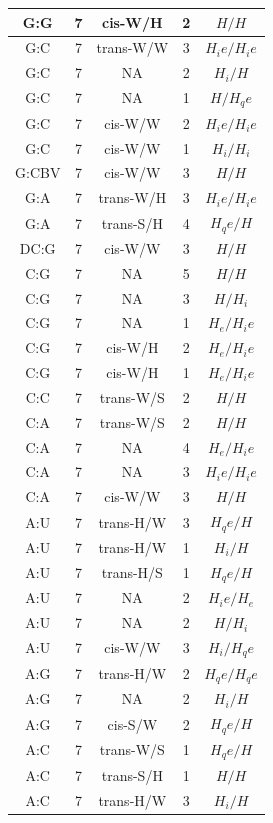 \begin{center}
\begin{longtable}{c|c|c|c|c}
G:G & 7 & cis-W/H & 2 & $H/H$ \\  \hline
G:C & 7 & trans-W/W & 3 & $H_ie/H_ie$ \\  \hline
G:C & 7 & NA & 2 & $H_i/H$ \\  \hline
G:C & 7 & NA & 1 & $H/H_qe$ \\  \hline
G:C & 7 & cis-W/W & 2 & $H_ie/H_ie$ \\  \hline
G:C & 7 & cis-W/W & 1 & $H_i/H_i$ \\  \hline
G:CBV & 7 & cis-W/W & 3 & $H/H$ \\  \hline
G:A & 7 & trans-W/H & 3 & $H_ie/H_ie$ \\  \hline
G:A & 7 & trans-S/H & 4 & $H_qe/H$ \\  \hline
DC:G & 7 & cis-W/W & 3 & $H/H$ \\  \hline
C:G & 7 & NA & 5 & $H/H$ \\  \hline
C:G & 7 & NA & 3 & $H/H_i$ \\  \hline
C:G & 7 & NA & 1 & $H_e/H_ie$ \\  \hline
C:G & 7 & cis-W/H & 2 & $H_e/H_ie$ \\  \hline
C:G & 7 & cis-W/H & 1 & $H_e/H_ie$ \\  \hline
C:C & 7 & trans-W/S & 2 & $H/H$ \\  \hline
C:A & 7 & trans-W/S & 2 & $H/H$ \\  \hline
C:A & 7 & NA & 4 & $H_e/H_ie$ \\  \hline
C:A & 7 & NA & 3 & $H_ie/H_ie$ \\  \hline
C:A & 7 & cis-W/W & 3 & $H/H$ \\  \hline
A:U & 7 & trans-H/W & 3 & $H_qe/H$ \\  \hline
A:U & 7 & trans-H/W & 1 & $H_i/H$ \\  \hline
A:U & 7 & trans-H/S & 1 & $H_qe/H$ \\  \hline
A:U & 7 & NA & 2 & $H_ie/H_e$ \\  \hline
A:U & 7 & NA & 2 & $H/H_i$ \\  \hline
A:U & 7 & cis-W/W & 3 & $H_i/H_qe$ \\  \hline
A:G & 7 & trans-H/W & 2 & $H_qe/H_qe$ \\  \hline
A:G & 7 & NA & 2 & $H_i/H$ \\  \hline
A:G & 7 & cis-S/W & 2 & $H_qe/H$ \\  \hline
A:C & 7 & trans-W/S & 1 & $H_qe/H$ \\  \hline
A:C & 7 & trans-S/H & 1 & $H/H$ \\  \hline
A:C & 7 & trans-H/W & 3 & $H_i/H$ \\  \hline

\end{longtable}
\end{center}
